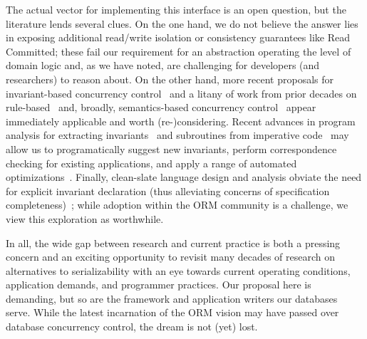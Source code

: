 The actual vector for implementing this interface is an open question,
but the literature lends several clues. On the one hand, we do not
believe the answer lies in exposing additional read/write isolation or
consistency guarantees like Read Committed; these fail our requirement
for an abstraction operating the level of domain logic and, as we have
noted, are challenging for developers (and researchers) to reason
about. On the other hand, more recent proposals for invariant-based
concurrency control~\cite{redblue-new,coord-avoid} and a litany of
work from prior decades on rule-based~\cite{activedb-book} and,
broadly, semantics-based concurrency control~\cite{tamer-book} appear
immediately applicable and worth (re-)considering. Recent advances in
program analysis for extracting invariants~\cite{writes-forest} and
subroutines from imperative code~\cite{statusquo} may allow us to
programatically suggest new invariants, perform correspondence
checking for existing applications, and apply a range of automated
optimizations~\cite{pyxis}. Finally, clean-slate language design and
analysis obviate the need for explicit invariant declaration (thus
alleviating concerns of specification
completeness)~\cite{calm,blazes}; while adoption within the ORM
community is a challenge, we view this exploration as worthwhile.

In all, the wide gap between research and current practice is both a
pressing concern and an exciting opportunity to revisit many decades of
research on alternatives to serializability with an eye towards
current operating conditions, application demands, and programmer
practices. Our proposal here is demanding, but so are the framework
and application writers our databases serve. While the latest
incarnation of the ORM vision may have passed over database
concurrency control, the dream is not (yet) lost.
